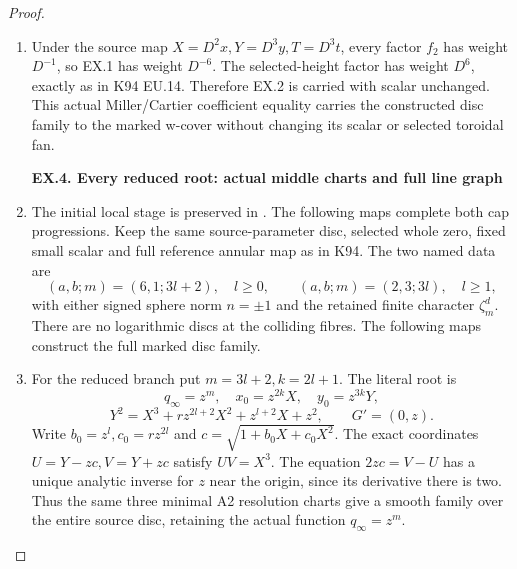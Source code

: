 \begin{proof}
\begin{enumerate}[label=\arabic*.]
\par

\medskip\noindent\textbf{EX.3. Marked-cover coefficient check}

\par\nobreak

\item Under the source map \(X=D^2x,Y=D^3y,T=D^3t\), every factor
\(f_2\) has weight \(D^{-1}\), so EX.1 has weight \(D^{-6}\).
The selected-height factor has weight \(D^6\), exactly as in
K94 EU.14. Therefore EX.2 is carried with scalar unchanged.
This actual Miller/Cartier coefficient equality carries the
constructed disc family to the marked w-cover without changing
its scalar or selected toroidal fan.

\par

\medskip\noindent\textbf{EX.4. Every reduced root: actual middle charts and full line graph}

\par\nobreak

\item The initial local stage is preserved in . The following maps complete both cap progressions.
Keep the same source-parameter disc, selected whole zero, fixed
small scalar and full reference annular map as in K94. The two
named data are
\[
 (a,b;m)=(6,1;3l+2),\quad l\ge0,
 \qquad (a,b;m)=(2,3;3l),\quad l\ge1,
\]
with either signed sphere norm \(n=\pm1\) and the retained finite
character \(\zeta_m^d\). There are no logarithmic discs at the
colliding fibres. The following maps construct the full marked disc family.

\item For the reduced branch put \(m=3l+2,k=2l+1\). The literal root is
\[
 q_\infty=z^m,\quad x_0=z^{2k}X,\quad y_0=z^{3k}Y,
\]
\[
 Y^2=X^3+r z^{2l+2}X^2+z^{l+2}X+z^2,\qquad G'=(0,z).
 \tag{EX.6}
\]
Write \(b_0=z^l,c_0=r z^{2l}\) and
\(c=\sqrt{1+b_0X+c_0X^2}\). The exact coordinates
\(U=Y-zc,V=Y+zc\) satisfy \(UV=X^3\). The equation
\(2zc=V-U\) has a unique analytic inverse for \(z\) near the
origin, since its derivative there is two. Thus the same three
minimal A2 resolution charts give a smooth family over the entire
source disc, retaining the actual function \(q_\infty=z^m\).


\end{enumerate}
\end{proof}
